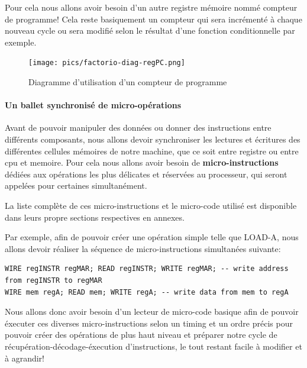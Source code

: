 \documentclass{scrreprt}
\begin{document}
	    	Pour cela nous allons avoir besoin d'un autre registre mémoire nommé compteur de programme!
	    	Cela reste basiquement un compteur qui sera incrémenté à chaque nouveau cycle ou sera modifié selon le résultat d'une fonction conditionnelle par exemple.
	    	
	    	
	    	\begin{figure}[h]
	    		\centering
	    		\texttt{[image: pics/factorio-diag-regPC.png]}
	    		
	    		\caption{Diagramme d'utilisation d'un compteur de programme}
	    	\end{figure}
    	
    		\paragraph{Un ballet synchronisé de micro-opérations}
    		Avant de pouvoir manipuler des données ou donner des instructions entre différents composants, nous allons devoir synchroniser les lectures et écritures des différentes cellules mémoires de notre machine, que ce soit entre registre ou entre cpu et memoire.
    		Pour cela nous allons avoir besoin de \textbf{micro-instructions} dédiées aux opérations les plus délicates et réservées au processeur, qui seront appelées pour certaines simultanément. 
    		
    		\begin{info}
    			La liste complète de ces micro-instructions et le micro-code utilisé est disponible dans leurs propre sections respectives en annexes.
    		\end{info}
    		
    		Par exemple, afin de pouvoir créer une opération simple telle que LOAD-A, nous allons devoir réaliser la séquence de micro-instructions simultanées suivante: 
    		
    		\begin{verbatim}
WIRE regINSTR regMAR; READ regINSTR; WRITE regMAR; -- write address from regINSTR to regMAR
WIRE mem regA; READ mem; WRITE regA; -- write data from mem to regA
    		\end{verbatim}
    		
    		
    		Nous allons donc avoir besoin d'un lecteur de micro-code basique afin de pouvoir éxecuter ces diverses micro-instructions selon un timing et un ordre précis pour pouvoir créer des opérations de plus haut niveau et préparer notre cycle de récupération-décodage-éxecution d'instructions, le tout restant facile à modifier et à agrandir!
    		
\end{document}

